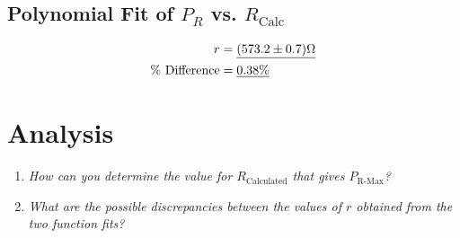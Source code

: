 \documentclass[twocolumn,english]{IEEEtran}
\theoremstyle{plain}
\theoremstyle{plain}
\begin{document}
  \subsection{\textbf{Polynomial Fit of $P_R$ vs. $R_{\text{Calc}}$}}
  \begin{align*}
   r 				&= \text{\underline{$(573.2 \pm 0.7)\Omega$}}	\\
   \text{\% Difference} 	&= \text{\underline{0.38\%}}
  \end{align*}

\section{Analysis}
\begin{enumerate}
 \item \textit{How can you determine the value for $R_{\text{Calculated}}$ that gives $P_{\text{R-Max}}$?}
 \item \textit{What are the possible discrepancies between the values of $r$ obtained from the two function fits?}
\end{enumerate}


\appendices{}

%
%
\end{document}
